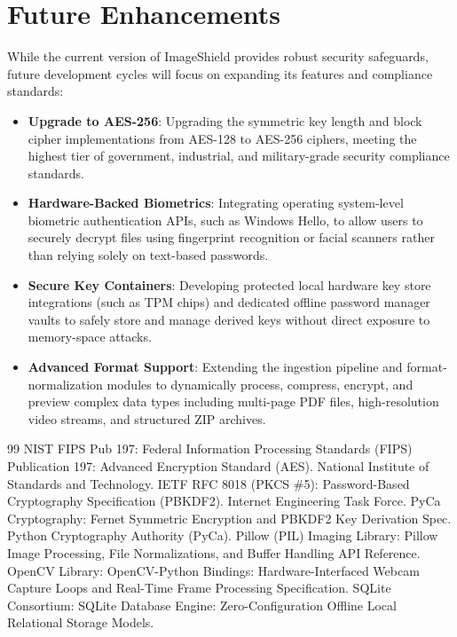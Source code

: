 \documentclass[12pt,a4paper]{report}
\begin{document}
\section{Future Enhancements}
While the current version of ImageShield provides robust security safeguards, future development cycles will focus on expanding its features and compliance standards:
\begin{itemize}
    \item \textbf{Upgrade to AES-256}: Upgrading the symmetric key length and block cipher implementations from AES-128 to AES-256 ciphers, meeting the highest tier of government, industrial, and military-grade security compliance standards.
    \item \textbf{Hardware-Backed Biometrics}: Integrating operating system-level biometric authentication APIs, such as Windows Hello, to allow users to securely decrypt files using fingerprint recognition or facial scanners rather than relying solely on text-based passwords.
    \item \textbf{Secure Key Containers}: Developing protected local hardware key store integrations (such as TPM chips) and dedicated offline password manager vaults to safely store and manage derived keys without direct exposure to memory-space attacks.
    \item \textbf{Advanced Format Support}: Extending the ingestion pipeline and format-normalization modules to dynamically process, compress, encrypt, and preview complex data types including multi-page PDF files, high-resolution video streams, and structured ZIP archives.
\end{itemize}

\begin{thebibliography}{99}
 NIST FIPS Pub 197: Federal Information Processing Standards (FIPS) Publication 197: Advanced Encryption Standard (AES). National Institute of Standards and Technology.
 IETF RFC 8018 (PKCS \#5): Password-Based Cryptography Specification (PBKDF2). Internet Engineering Task Force.
 PyCa Cryptography: Fernet Symmetric Encryption and PBKDF2 Key Derivation Spec. Python Cryptography Authority (PyCa).
 Pillow (PIL) Imaging Library: Pillow Image Processing, File Normalizations, and Buffer Handling API Reference.
 OpenCV Library: OpenCV-Python Bindings: Hardware-Interfaced Webcam Capture Loops and Real-Time Frame Processing Specification.
 SQLite Consortium: SQLite Database Engine: Zero-Configuration Offline Local Relational Storage Models.
\end{thebibliography}
\end{document}
